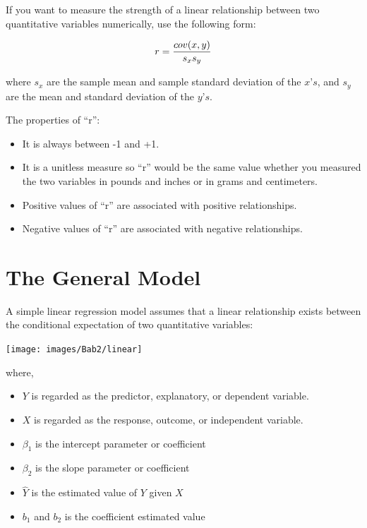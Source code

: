 \documentclass[
]{book}
\providecommand{\tightlist}{%
  \setlength{\itemsep}{0pt}\setlength{\parskip}{0pt}}
\begin{document}
If you want to measure the strength of a linear relationship between two quantitative variables numerically, use the following form:

\[
\begin{aligned}
r={cov(x,y)\over s_x s_y}
\end{aligned}
\]

where \(s_x\) are the sample mean and sample standard deviation of the \(x’s\), and \(s_y\) are the mean and standard deviation of the \(y’s.\)

The properties of ``r'':

\begin{itemize}
\tightlist
\item
  It is always between -1 and +1.
\item
  It is a unitless measure so ``r'' would be the same value whether you measured the two variables in pounds and inches or in grams and centimeters.
\item
  Positive values of ``r'' are associated with positive relationships.
\item
  Negative values of ``r'' are associated with negative relationships.
\end{itemize}

\hypertarget{the-general-model}{%
\section{The General Model}\label{the-general-model}}

A simple linear regression model assumes that a linear relationship exists between the conditional expectation of two quantitative variables:

\begin{center}\texttt{[image: images/Bab2/linear]} \end{center}

where,

\begin{itemize}
\tightlist
\item
  \(Y\) is regarded as the predictor, explanatory, or dependent variable.
\item
  \(X\) is regarded as the response, outcome, or independent variable.
\item
  \(\beta_1\) is the intercept parameter or coefficient
\item
  \(\beta_2\) is the slope parameter or coefficient
\item
  \(\hat{Y}\) is the estimated value of \(Y\) given \(X\)
\item
  \(b_1\) and \(b_2\) is the coefficient estimated value
\end{itemize}
\end{document}
